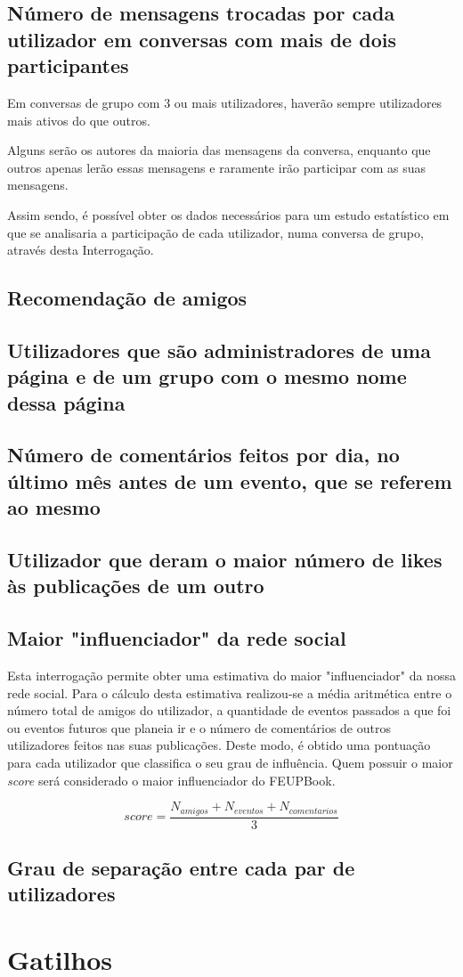 \documentclass[12pt]{report}
\begin{document}
\section{Número de mensagens trocadas por cada utilizador em conversas com mais de dois participantes}

Em conversas de grupo com 3 ou mais utilizadores, haverão sempre utilizadores mais ativos do que outros. \par
Alguns serão os autores da maioria das mensagens da conversa, enquanto que outros apenas lerão essas mensagens e raramente irão participar com as suas mensagens. \par
Assim sendo, é possível obter os dados necessários para um estudo estatístico em que se analisaria a participação de cada utilizador, numa conversa de grupo, através desta Interrogação.

\section{Recomendação de amigos}

\section{Utilizadores que são administradores de uma página e de um grupo com o mesmo nome dessa página}

\section{Número de comentários feitos por dia, no último mês antes de um evento, que se referem ao mesmo}

\section{Utilizador que deram o maior número de likes às publicações de um outro}

\section{Maior "influenciador" da rede social}

Esta interrogação permite obter uma estimativa do maior "influenciador" da nossa rede social. Para o cálculo desta estimativa realizou-se a média aritmética entre o número total de amigos do utilizador, a quantidade de eventos passados a que foi ou eventos futuros que planeia ir e o número de comentários de outros utilizadores feitos nas suas publicações.
Deste modo, é obtido uma pontuação para cada utilizador que classifica o seu grau de influência. Quem possuir o maior \textit{score} será considerado o maior influenciador do FEUPBook.

\begin{equation*}
    score = \frac{N_{amigos} + N_{eventos} + N_{comentarios}}{3}
\end{equation*}

\section{Grau de separação entre cada par de utilizadores}
      
\chapter{Gatilhos}
\end{document}
